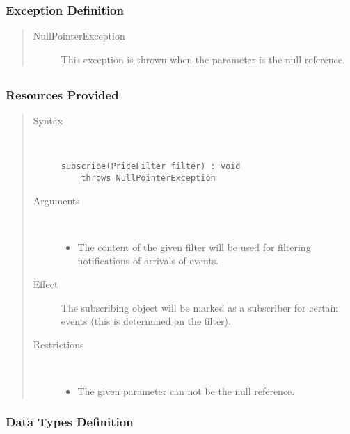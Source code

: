 \subsubsection{Exception Definition} 

\begin{quote}
	\begin{description}
		\item[NullPointerException] This exception is thrown when the parameter
		is the null reference.
	\end{description} 
\end{quote}

\subsection{}

\subsubsection{Resources Provided}

\begin{quote}
	\begin{description}
		\item[Syntax] \
		\begin{verbatim}
subscribe(PriceFilter filter) : void
    throws NullPointerException
		\end{verbatim}
		\item[Arguments] \
		\begin{itemize}
		  \item The content of the given filter will be used for filtering
		  notifications of arrivals of events.
		\end{itemize}
		\item[Effect] The subscribing object will be marked as a subscriber for
		certain events (this is determined on the filter).
		\item[Restrictions] \
		\begin{itemize}
		  \item The given parameter can not be the null reference.
		\end{itemize}
	\end{description} 
\end{quote}

\subsubsection{Data Types Definition}

